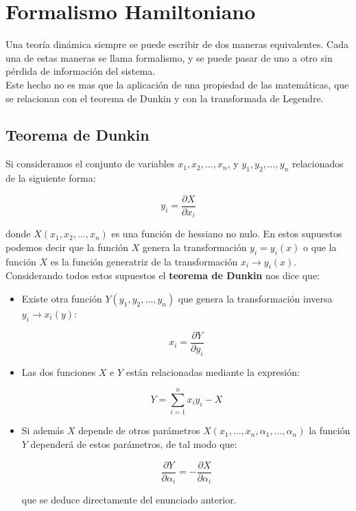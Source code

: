 \documentclass[12pt,a4paper]{book}
\newcommand{\parciales}[2]{\frac{\partial #1}{\partial #2}}
\begin{document}
\section{Formalismo Hamiltoniano}

Una teoría dinámica siempre se puede escribir de dos maneras equivalentes. Cada una de estas maneras se llama formalismo, y se puede pasar de uno a otro sin pérdida de información del sistema. \\

Este hecho no es mas que la aplicación de una propiedad de las matemáticas, que se relacionan con el teorema de Dunkin y con la transformada de Legendre.

\subsection{Teorema de Dunkin}

Si consideramos el conjunto de variables $x_1,x_2,\ldots,x_n$, y $y_1,y_2,\ldots,y_n$ relacionados de la siguiente forma:

\begin{equation}
y_i = \parciales{X}{x_i}
\end{equation}

donde $X(x_1,x_2,...,x_n)$ es una función de hessiano no nulo. En estos supuestos podemos decir que la función $X$ genera la transformación $y_i = y_i (x)$ o que la función $X$ es la función generatriz de la transformación $x_i \rightarrow y_i (x)$. Considerando todos estos supuestos el \textbf{teorema de Dunkin} nos dice que:

\begin{itemize}
\item Existe otra función $Y(y_1,y_2,\ldots,y_n)$ que genera la transformación inversa $y_i \rightarrow x_i(y)$:

\begin{equation}
x_i = \parciales{Y}{y_i}
\end{equation}

\item Las dos funciones $X$ e $Y$ están relacionadas mediante la expresión:

\begin{equation}
Y = \sum_{i=1}^n x_i y_i - X
\end{equation}

\item Si además $X$ depende de otros parámetros $X(x_1,\ldots,x_n,\alpha_1,\ldots,\alpha_n)$ la función $Y$ dependerá de estos parámetros, de tal modo que:

\begin{equation}
\parciales{Y}{\alpha_i} =  - \parciales{X}{\alpha_i}
\end{equation}

que se deduce directamente del enunciado anterior.
\end{itemize}
\end{document}
